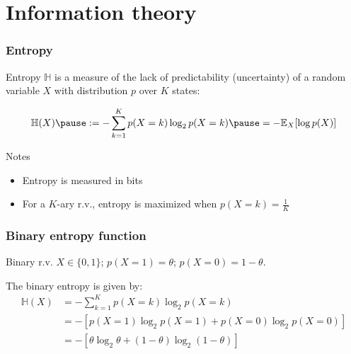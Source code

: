 \documentclass[smaller]{beamer}
\newcommand{\?}{\stackrel{?}{=}}
\newcommand{\fr}{\frac}
\newcommand{\expe}{\mathbb{E}}
\newcommand{\mb}{\mathbb}
\begin{document}
\section{Information theory}

\begin{frame}
  \frametitle{Entropy}
  \pause Entropy $\mathbb{H}$ is a measure of the lack of predictability (uncertainty) of a random variable $X$ with
  distribution $p$ over $K$ states: \pause

  \begin{equation}
    \mathbb{H}(X) \pause := -\sum_{k=1}^{K}p(X=k)\log_{2}p(X=k) \pause = -\expe_{X}[\log p(X)]
  \end{equation}

  \pause

  \begin{alertblock}{Notes}
    \begin{itemize}
    \item Entropy is measured in bits
      \pause
    \item For a $K$-ary r.v., entropy is maximized when $p(X=k) = \fr1K$
    \end{itemize}
    
  \end{alertblock}
\end{frame}

\begin{frame}
  \frametitle{Binary entropy function}
  \pause

  Binary r.v. $X\in \{0,1\}$; \pause $p(X=1) = \theta$; \pause $p(X=0) = 1 - \theta$. \pause

  \bigskip

  The binary entropy is given by:
  \pause
  \begin{align}
    \mb{H}(X) &=  -\sum_{k=1}^{K}p(X=k)\log_{2}p(X=k) \\
              &= -[p(X=1)\log_{2} p(X=1) + p(X=0)\log_{2}p(X=0)] \\
              &= -[\theta \log_{2}\theta + (1 - \theta)\log_{2}(1-\theta)]
  \end{align}
\end{frame}
\end{document}
